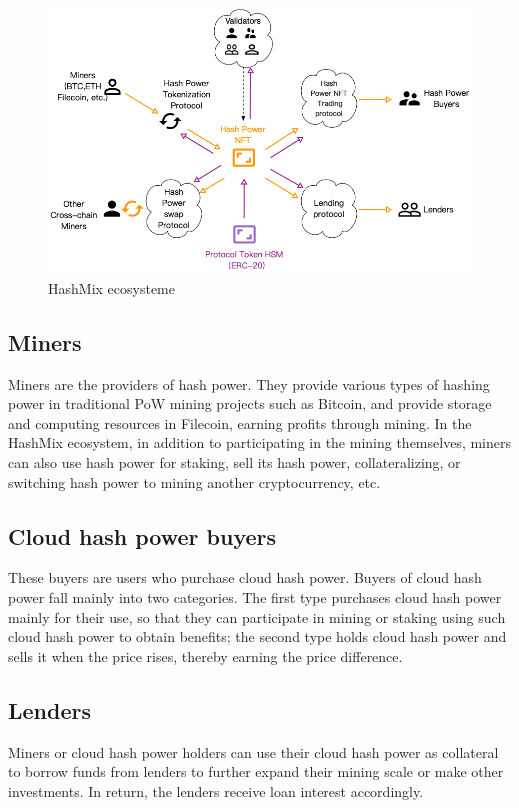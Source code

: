 \documentclass[]{template/llncs}
\begin{document}
\begin{figure}[htbp]
\centering
\includegraphics[width=0.9\columnwidth]{figure/HashMix-eco-new-en}
\caption{HashMix ecosysteme}
\label{fig:eco}
\end{figure}

\subsection{Miners}
Miners are the providers of hash power. They provide various types of hashing power in traditional PoW mining projects such as Bitcoin, and provide storage and computing resources in Filecoin, earning profits through mining. In the HashMix ecosystem, in addition to participating in the mining themselves, miners can also use hash power for staking, sell its hash power, collateralizing, or switching hash power to mining another cryptocurrency, etc.

\subsection{Cloud hash power buyers}

These buyers are users who purchase cloud hash power. Buyers of cloud hash power fall mainly into two categories. The first type purchases cloud hash power mainly for their use, so that they can participate in mining or staking using such cloud hash power to obtain benefits; the second type holds cloud hash power and sells it when the price rises, thereby earning the price difference.

\subsection{Lenders}

Miners or cloud hash power holders can use their cloud hash power as collateral to borrow funds from lenders to further expand their mining scale or make other investments. In return, the lenders receive loan interest accordingly.
\end{document}
